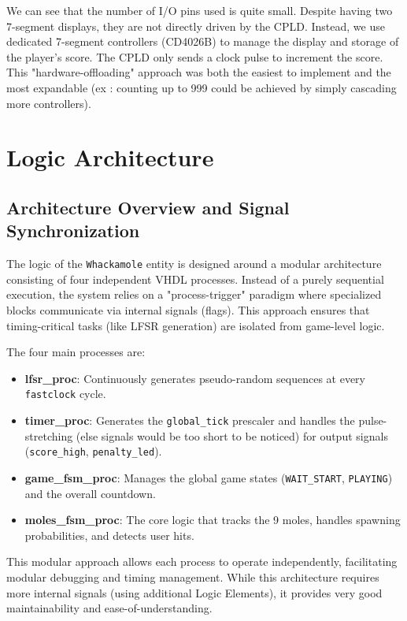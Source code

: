 \documentclass[12pt,a4paper]{article}
\begin{document}
We can see that the number of I/O pins used is quite small. Despite having two 7-segment displays, they are not directly driven by the CPLD. Instead, we use dedicated 7-segment controllers (CD4026B) to manage the display and storage of the player's score. The CPLD only sends a clock pulse to increment the score. This "hardware-offloading" approach was both the easiest to implement and the most expandable (ex : counting up to 999 could be achieved by simply cascading more controllers).

\newpage
\section{Logic Architecture}

\subsection{Architecture Overview and Signal Synchronization}
The logic of the \texttt{Whackamole} entity is designed around a modular architecture consisting of four independent VHDL processes. Instead of a purely sequential execution, the system relies on a "process-trigger" paradigm where specialized blocks communicate via internal signals (flags). This approach ensures that timing-critical tasks (like LFSR generation) are isolated from game-level logic.

The four main processes are:
\begin{itemize}
    \item \textbf{lfsr\_proc}: Continuously generates pseudo-random sequences at every \texttt{fastclock} cycle.
    \item \textbf{timer\_proc}: Generates the \texttt{global\_tick} prescaler and handles the pulse-stretching (else signals would be too short to be noticed) for output signals (\texttt{score\_high}, \texttt{penalty\_led}).
    \item \textbf{game\_fsm\_proc}: Manages the global game states (\texttt{WAIT\_START}, \texttt{PLAYING}) and the overall countdown.
    \item \textbf{moles\_fsm\_proc}: The core logic that tracks the 9 moles, handles spawning probabilities, and detects user hits.
\end{itemize}

This modular approach allows each process to operate independently, facilitating modular debugging and timing management. While this architecture requires more internal signals (using additional Logic Elements), it provides very good maintainability and ease-of-understanding. 
\end{document}
